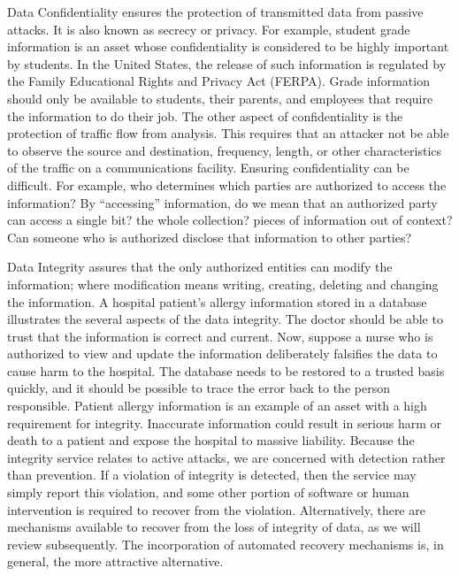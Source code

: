 	Data Confidentiality ensures the protection of transmitted data from passive attacks.
	It is also known as secrecy or privacy.
	For example, student grade information is an asset whose confidentiality is considered to be highly important by students.
	In the United States, the release of such information is regulated by the Family Educational Rights and Privacy Act (FERPA).
	Grade information should only be available to students, their parents, and employees that require the information to do their job.
	The other aspect of confidentiality is the protection of traffic flow from analysis.
	This requires that an attacker not be able to observe the source and destination, frequency, length, or other characteristics of the traffic on a communications facility.
	Ensuring confidentiality can be difficult.
	For example, who determines which parties are authorized to access the information?
	By ``accessing'' information, do we mean that an authorized party can access a single bit? the whole collection? pieces of information out of context?
	Can someone who is authorized disclose that information to other parties?\cite{pfleeger2002security}
	
	Data Integrity assures that the only authorized entities can modify the information; where modification means writing, creating, deleting and changing the information.
	A hospital patient's allergy information stored in a database illustrates the several aspects of the data integrity.
	The doctor should be able to trust that the information is correct and current.
	Now, suppose a nurse who is authorized to view and update the information deliberately falsifies the data to cause harm to the hospital.
	The database needs to be restored to a trusted basis quickly, and it should be possible to trace the error back to the person responsible.
	Patient allergy information is an example of an asset with a high requirement for integrity. 
	Inaccurate information could result in serious harm or death to a patient and expose the hospital to massive liability.
	Because the integrity service relates to active attacks, we are concerned with detection rather than prevention.
	If a violation of integrity is detected, then the service may simply report this violation, and some other portion of software or human intervention is required to recover from the violation.
	Alternatively, there are mechanisms available to recover from the loss of integrity of data, as we will review subsequently. The incorporation of automated recovery mechanisms is, in general, the more attractive alternative.
	
